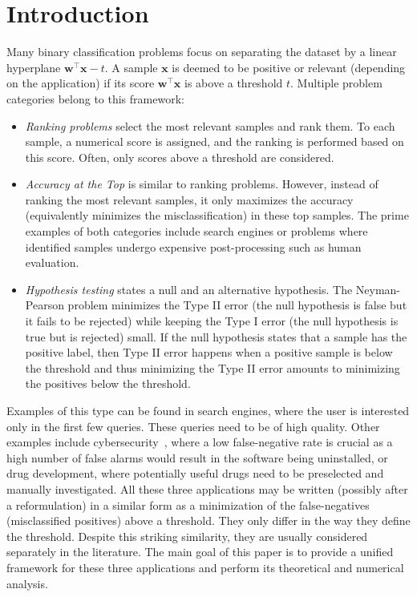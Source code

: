 \documentclass[]{interact}
\theoremstyle{plain}%
\theoremstyle{definition}
\theoremstyle{remark}
\newcommand{\NEW}[1]{{\color{blue} #1}}
\begin{document}
\section{Introduction}\label{sec:Motivation}



Many binary classification problems focus on separating the dataset by a linear hyperplane $\bm w^\top \bm x-t$. A sample $\bm x$ is deemed to be positive or relevant (depending on the application) if its score $\bm w^\top \bm x$ is above a threshold $t$. Multiple problem categories belong to this framework:
\begin{itemize}\itemsep 0pt
\item \textit{Ranking problems} select the most relevant samples and rank them. To each sample, a numerical score is assigned, and the ranking is performed based on this score. Often, only scores above a threshold are considered.
\item \textit{Accuracy at the Top} is similar to ranking problems. However, instead of ranking the most relevant samples, it only maximizes the accuracy (equivalently minimizes the misclassification) in these top samples. The prime examples of both categories include search engines or problems where identified samples undergo expensive post-processing such as human evaluation.
\item \textit{Hypothesis testing} states a null and an alternative hypothesis. The Neyman-Pearson problem minimizes the Type II error (the null hypothesis is false but it fails to be rejected) while keeping the Type I error (the null hypothesis is true but is rejected) small. If the null hypothesis states that a sample has the positive label, then Type II error happens when a positive sample is below the threshold and thus minimizing the Type II error amounts to minimizing the positives below the threshold.
\end{itemize}
\NEW{Examples of this type can be found in search engines, where the user is interested only in the first few queries. These queries need to be of high quality. Other examples include cybersecurity~\cite{Grill_2016}, where a low false-negative rate is crucial as a high number of false alarms would result in the software being uninstalled, or drug development, where potentially useful drugs need to be preselected and manually investigated.} All these three applications may be written (possibly after a reformulation) in a similar form as a minimization of the false-negatives (misclassified positives) above a threshold. They only differ in the way they define the threshold. Despite this striking similarity, they are usually considered separately in the literature. The main goal of this paper is to provide a unified framework for these three applications and perform its theoretical and numerical analysis.
\end{document}
